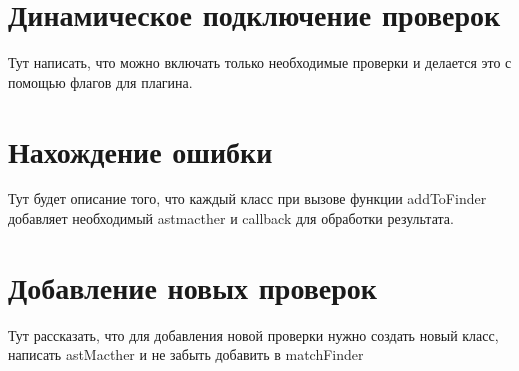 \section{Динамическое подключение проверок}
Тут написать, что можно включать только необходимые проверки и делается это с помощью флагов 
для плагина.

\section{Нахождение ошибки}
Тут будет описание того, что каждый класс при вызове функции addToFinder
добавляет необходимый astmacther и callback для обработки результата.

\section{Добавление новых проверок}
Тут рассказать, что для добавления новой проверки нужно создать новый класс, написать astMacther
и не забыть добавить в matchFinder